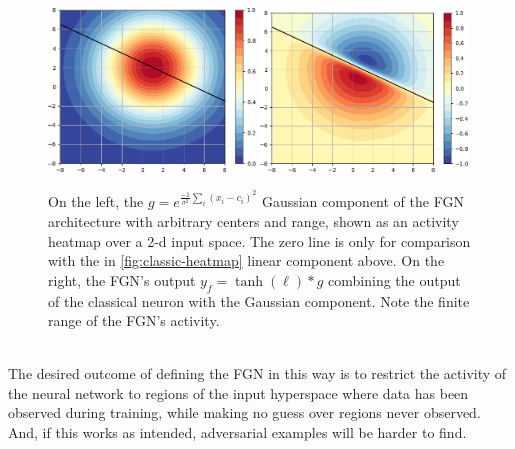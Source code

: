 \documentclass[12pt,oneside]{CUNY_PhD}
\begin{document}
\begin{figure}[!htbp]
    \centering
    \includegraphics[width=0.49\textwidth]{images/2D Activity/2d-gaussian-activity-cropped.png}
    \includegraphics[width=0.49\textwidth]{images/2D Activity/2d-fgn-activity-cropped.png}
    \caption{On the left, the $g = e^{\frac{-1}{\sigma^2}\sum_{i}(x_i-c_i)^2}$ Gaussian component of the FGN architecture with arbitrary centers and range, shown as an activity heatmap over a 2-d input space. The zero line is only for comparison with the in \ref{fig:classic-heatmap} linear component above. On the right, the FGN's output $y_f = \tanh(\ell) * g$ combining the output of the classical neuron with the Gaussian component. Note the finite range of the FGN's activity.}
    \label{fig:fgn-heatmap}
\end{figure}\\
The desired outcome of defining the FGN in this way is to restrict the activity of the neural network to  regions of the input hyperspace where data has been observed during training, while making no guess over regions never observed. And, if this works as intended, adversarial examples will be harder to find.\\
\end{document}
